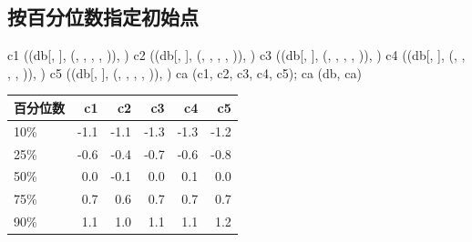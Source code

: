 \subsection{按百分位数指定初始点}
\begin{code}
c1 \ROperator{<-} ((db[, ], (, , , , )), )
c2 \ROperator{<-} ((db[, ], (, , , , )), )
c3 \ROperator{<-} ((db[, ], (, , , , )), )
c4 \ROperator{<-} ((db[, ], (, , , , )), )
c5 \ROperator{<-} ((db[, ], (, , , , )), )
ca \ROperator{<-} (c1, c2, c3, c4, c5); ca
(db, ca)
\end{code}
\par\addvspace{5pt}\begin{center}\begin{minipage}{\linewidth}\centering
\small
{}
\begin{tabular}{lrrrrr}\toprule
{\bfseries 百分位数 }&{\bfseries  c1 }&{\bfseries  c2 }&{\bfseries  c3 }&{\bfseries  c4 }&{\bfseries  c5}\\\midrule
10\% & -1.1 & -1.1 & -1.3 & -1.3 & -1.2\\
25\% & -0.6 & -0.4 & -0.7 & -0.6 & -0.8\\
50\% & 0.0 & -0.1 & 0.0 & 0.1 & 0.0\\
75\% & 0.7 & 0.6 & 0.7 & 0.7 & 0.7\\
90\% & 1.1 & 1.0 & 1.1 & 1.1 & 1.2\\
\bottomrule\end{tabular}
\end{minipage}\end{center}

